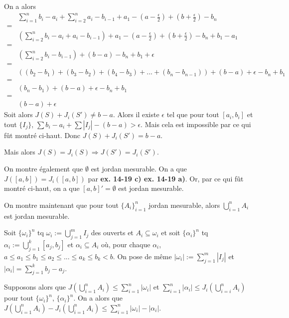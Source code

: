 \documentclass[a4paper,10pt]{article}
\begin{document}
On a alors
\begin{align*}
	& \sum_{i=1}^n b_i - a_i + \sum_{i=2}^n a_i - b_{i-1} + a_1 - (a - \frac{\epsilon}{2}) + (b + \frac{\epsilon}{2}) - b_n \\
	= \\
	& \left(\sum_{i=2}^n b_i - a_i + a_i - b_{i-1} \right)  + a_1 - (a - \frac{\epsilon}{2}) + (b + \frac{\epsilon}{2}) - b_n + b_1 - a_1 \\
	= \\
	& \left ( \sum_{i=2}^n b_i - b_{i-1} \right ) + (b - a) - b_n + b_1 + \epsilon \\
	= \\
	& ((b_2 - b_1) + (b_3 - b_2) + (b_4 - b_3) + ... + (b_n - b_{n-1})) + (b - a) + \epsilon - b_n + b_1 \\
	= \\
	& (b_n - b_1) +(b-a) + \epsilon - b_n + b_1 \\
	= \\
	& (b - a) + \epsilon
\end{align*}
Soit alors $J(S) + J_i (S') \not = b - a$. Alors il existe $\epsilon$ tel que pour tout $[a_i, b_i]$ et tout $\{I_j\}$, $\sum b_i - a_i + \sum |I_j| - (b - a) > \epsilon$. Mais cela est impossible par ce qui fût montré ci-haut. Donc $J(S) + J_i(S') = b-a$.

Mais alors $J(S) = J_i(S) \Rightarrow J(S') = J_i (S')$.

On montre également que $\emptyset$ est jordan mesurable. On a que $J([a,b]) = J_i ([a,b])$ par \textbf{ex. 14-19 c) ex. 14-19 a)}. Or, par ce qui fût montré  ci-haut, on a que $[a,b]' = \emptyset$ est jordan mesurable.

On montre maintenant que pour tout $\{A_i\}_{i=1}^n$ jordan mesurable, alors $\bigcup_{i=1}^n A_i$ est jordan mesurable.

Soit $\{\omega_i\}^n$ tq $\omega_i := \bigcup_{j=1}^m I_j$ des ouverts et $A_i \subseteq \omega_i$ et soit $\{\alpha_i\}^n$ tq $\alpha_i := \bigcup_{j=1}^k [a_j, b_j]$ et $\alpha_i \subseteq A_i$ où, pour chaque $\alpha_i$, $a \leq a_1 \leq b_1 \leq a_2 \leq ... \leq a_k \leq b_k < b$. On pose de même $|\omega_i| := \sum_{j=1}^m |I_j|$ et $|\alpha_i| = \sum_{j=1}^k b_j - a_j$.

Supposons alors que $J(\bigcup_{i=1}^n A_i) \leq \sum_{i=1}^n |\omega_i|$ et $\sum_{i=1}^n |\alpha_i| \leq J_i(\bigcup_{i=i}^n A_i)$ pour tout $\{\omega_i\}^n$, $\{\alpha_i\}^n$. On a alors que $J(\bigcup_{i=1}^n A_i) - J_i (\bigcup_{i=1}^n A_i) \leq \sum_{i=1}^n |\omega_i| - |\alpha_i|$.
\end{document}
